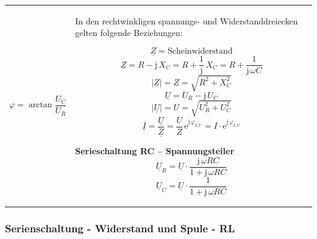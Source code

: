 \documentclass[a4paper,12pt]{article}
\begin{document}
\begin{tabular}{p{} p{}}
		$$
		\varphi = \arctan\frac{U_C}{U_R}
		$$
		
		&
		
		\vspace{0pt}
		In den rechtwinkligen spannungs- und Widerstanddreiecken gelten folgende Beziehungen:
		
		\vspace{0pt}
		$$
		\underline{Z} = \text{Scheinwiderstand}
		$$
		$$
		\underline{Z} = R - \mathrm{j}\, X_C = R + \frac{1}{\mathrm{j}}\, X_C = R + \frac{1}{\mathrm{j}\,\omega C}
		$$
		$$
		|\underline{Z}| = Z = \sqrt{R^2 + X_C^2}
		$$
		$$
		\underline{U} = U_R - \mathrm{j}\, U_C
		$$
		$$
		|\underline{U}| = U = \sqrt{U_R^2 + U_C^2}
		$$
		$$
		\underline{I} = \frac{\underline{U}}{\underline{Z}} = \frac{U}{Z}\,\mathrm{e}^{\mathrm{j}\,\varphi_{I,U}} = I \cdot \mathrm{e}^{\mathrm{j}\,\varphi_{I,U}}
		$$
		
		\textbf{Serieschaltung RC -- Spannungsteiler}
		$$\underline{U}_R = \underline{U} \cdot \frac{\mathrm{j}\,\omega RC}{1 + \mathrm{j}\,\omega RC}$$
		$$\underline{U}_C = \underline{U} \cdot \frac{1}{1 + \mathrm{j}\,\omega RC}$$
		
	\end{tabular}
	
	\subsubsection{Serienschaltung - Widerstand und Spule - RL}
	
\end{document}
